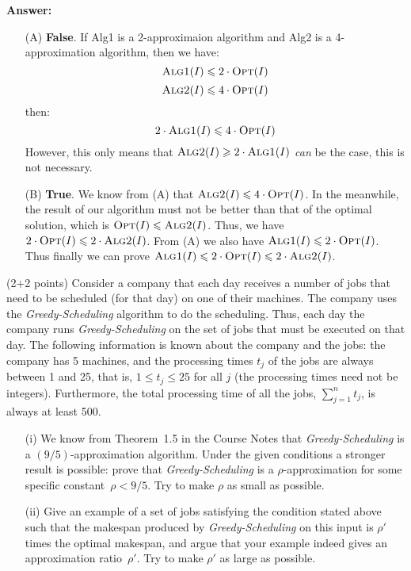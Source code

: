 \documentclass{article}
\renewcommand{\leq}{\leqslant}
\renewcommand{\geq}{\geqslant}
\newcounter{rcounter}
\newenvironment{rlist}%
{\begin{list}{\setnr-\arabic{rcounter}}{\usecounter{rcounter}}}{\end{list}}
\begin{document}
\begin{rlist}
		\textbf{Answer:}
		\begin{enumerate}
			\item[(A)]
			\textbf{False}. If {\sc Alg1} is a 2-approximaion algorithm and {\sc Alg2} is a 4-approximation algorithm, then we have:
			$$\mbox{{\sc Alg1}}(I) \leq 2\cdot \mbox{{\sc Opt}}(I)$$
			$$\mbox{{\sc Alg2}}(I) \leq 4\cdot \mbox{{\sc Opt}}(I)$$
			then:
			$$2\cdot \mbox{{\sc Alg1}}(I) \leq 4\cdot \mbox{{\sc Opt}}(I)$$
			However, this only means that $\mbox{{\sc Alg2}}(I) \geq 2\cdot \mbox{{\sc Alg1}}(I)$ \emph{can} be the case, this is not necessary.
			\item[(B)]
			\textbf{True}. We know from (A) that $\mbox{{\sc Alg2}}(I) \leq 4\cdot \mbox{{\sc Opt}}(I)$. In the meanwhile, the result of our algorithm must not be better than that of the optimal solution, which is $\mbox{{\sc Opt}}(I) \leq \mbox{{\sc Alg2}}(I)$. Thus, we have $2\cdot \mbox{{\sc Opt}}(I) \leq 2\cdot \mbox{{\sc Alg2}}(I)$.
			From (A) we also have $\mbox{{\sc Alg1}}(I) \leq 2\cdot \mbox{{\sc Opt}}(I)$. Thus finally we can prove $\mbox{{\sc Alg1}}(I) \leq 2\cdot \mbox{{\sc Opt}}(I) \leq 2\cdot \mbox{{\sc Alg2}}(I)$.
		\end{enumerate}
		\item (2+2 points)
		Consider a company that each day receives a number of jobs that need to be scheduled (for that day) on one of their machines. The company uses the \emph{Greedy-Scheduling} algorithm to do the scheduling. Thus, each day the company runs \emph{Greedy-Scheduling} on the set of jobs that must be executed on that day. The following information is known about the company and the jobs: the company has 5 machines, and the processing times $t_j$ of the jobs are always between 1 and 25, that is, $1\leq t_j\leq 25$ for all $j$ (the processing times need not be integers). Furthermore, the total processing time of all the jobs, $\sum_{j=1}^n t_j$, is always at least 500.
		\begin{enumerate}
			\item[(i)]
			We know from Theorem~1.5 in the Course Notes that \emph{Greedy-Scheduling} is a $(9/5)$-approximation algorithm. Under the given conditions a stronger result is possible: prove that \emph{Greedy-Scheduling} is a $\rho$-approximation  for some specific constant~$\rho<9/5$. Try to make $\rho$ as small as possible. 
			\item[(ii)]
			Give an example of a set of jobs satisfying the condition stated above such that the makespan produced by \emph{Greedy-Scheduling} on this input is $\rho'$ times the optimal makespan, and argue that your example indeed gives an approximation ratio~$\rho'$. Try to make $\rho'$ as large as possible.
		\end{enumerate}
		

\end{rlist}
\end{document}

